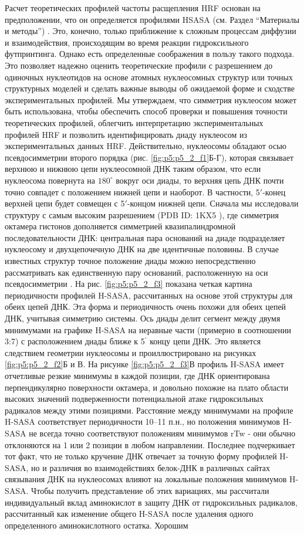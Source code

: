 Расчет теоретических профилей частоты расщепления HRF основан на предположении, что он определяется профилями HSASA (см. Раздел ``Материалы и методы'') \cite{jain_footprinting_2008-1}. Это, конечно, только приближение к сложным процессам диффузии и взаимодействия, происходящим во время реакции гидроксильного футпринтинга. Однако есть определенные соображения в пользу такого подхода. Это позволяет надежно оценить теоретические профили с разрешением до одиночных нуклеотидов на основе атомных нуклеосомных структур или точных структурных моделей и сделать важные выводы об ожидаемой форме и сходстве экспериментальных профилей. Мы утверждаем, что симметрия нуклеосом может быть использована, чтобы обеспечить способ проверки и повышения точности теоретических профилей, облегчить интерпретацию экспериментальных профилей HRF и позволить идентифицировать диаду нуклеосом из экспериментальных данных HRF. Действительно, нуклеосомы обладают осью псевдосимметрии второго порядка (рис. \ref{fig:p5:p5_2_f1}Б-Г), которая связывает верхнюю и нижнюю цепи нуклеосомной ДНК таким образом, что если нуклеосома повернута на $180^{\circ}$ вокруг оси диады, то верхняя цепь ДНК почти точно совпадет с положением нижней цепи и наоборот. В частности, 5$\prime$-конец верхней цепи будет совмещен с 5$\prime$-концом нижней цепи. Сначала мы исследовали структуру с самым высоким разрешением (PDB ID: 1KX5 \cite{davey_solvent_2002}), где симметрия октамера гистонов дополняется симметрией квазипалиндромной последовательности ДНК: центральная пара оснований на диаде подразделяет нуклеосому и двухцепочечную ДНК на две идентичные половины. В случае известных структур точное положение диады можно непосредственно рассматривать как единственную пару оснований, расположенную на оси псевдосимметрии \cite{luger_crystal_1997}. На рис. \ref{fig:p5:p5_2_f3} показана четкая картина периодичности профилей H-SASA, рассчитанных на основе этой структуры для обеих цепей ДНК. Эта форма и периодичность очень похожи для обеих цепей ДНК, учитывая симметрию системы. Ось диады делит сегмент между двумя минимумами на графике H-SASA на неравные части (примерно в соотношении 3:7) с расположением диады ближе к 5$^\prime$ концу цепи ДНК. Это является следствием геометрии нуклеосомы и проиллюстрировано на рисунках \ref{fig:p5:p5_2_f2}Б и В. На рисунке \ref{fig:p5:p5_2_f3}В профиль H-SASA имеет отчетливые резкие минимумы в каждой позиции, где ДНК ориентирована перпендикулярно поверхности октамера, и довольно похожие на плато области высоких значений подверженности потенциальной атаке гидроксильных радикалов между этими позициями. Расстояние между минимумами на профиле H-SASA соответствует периодичности 10–11 п.н., но положения минимумов H-SASA не всегда точно соответствуют положениям минимумов rTw - они обычно отклоняются на 1 или 2 позиции в любом направлении. Последнее подчеркивает тот факт, что не только кручение ДНК отвечает за точную форму профилей H-SASA, но и различия во взаимодействиях белок-ДНК в различных сайтах связывания ДНК на нуклеосомах влияют на локальные положения минимумов H-SASA. Чтобы получить представление об этих вариациях, мы рассчитали индивидуальный вклад аминокислот в защиту ДНК от гидроксильных радикалов, рассчитанный как изменение общего H-SASA после удаления одного определенного аминокислотного остатка. Хорошим 